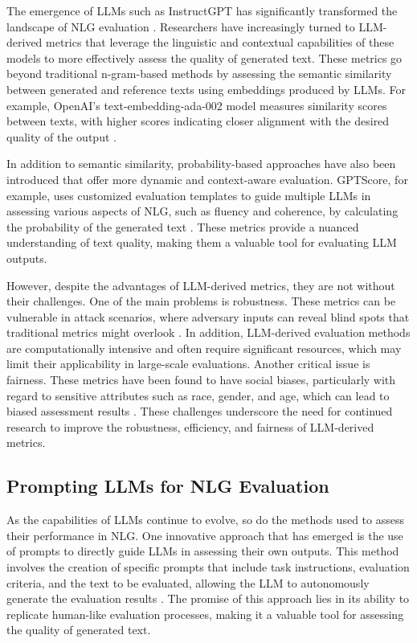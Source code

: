 The emergence of LLMs such as InstructGPT has significantly transformed the landscape of NLG evaluation \cite{ouyang2022training}. Researchers have increasingly turned to LLM-derived metrics that leverage the linguistic and contextual capabilities of these models to more effectively assess the quality of generated text. These metrics go beyond traditional n-gram-based methods by assessing the semantic similarity between generated and reference texts using embeddings produced by LLMs. For example, OpenAI's text-embedding-ada-002 model measures similarity scores between texts, with higher scores indicating closer alignment with the desired quality of the output \cite{es2023ragas}.

In addition to semantic similarity, probability-based approaches have also been introduced that offer more dynamic and context-aware evaluation. GPTScore, for example, uses customized evaluation templates to guide multiple LLMs in assessing various aspects of NLG, such as fluency and coherence, by calculating the probability of the generated text \cite{fu2023gptscore}. These metrics provide a nuanced understanding of text quality, making them a valuable tool for evaluating LLM outputs.

However, despite the advantages of LLM-derived metrics, they are not without their challenges. One of the main problems is robustness. These metrics can be vulnerable in attack scenarios, where adversary inputs can reveal blind spots that traditional metrics might overlook \cite{he2022blind}. In addition, LLM-derived evaluation methods are computationally intensive and often require significant resources, which may limit their applicability in large-scale evaluations. Another critical issue is fairness. These metrics have been found to have social biases, particularly with regard to sensitive attributes such as race, gender, and age, which can lead to biased assessment results \cite{sun2022bertscore}. These challenges underscore the need for continued research to improve the robustness, efficiency, and fairness of LLM-derived metrics.

\subsection{Prompting LLMs for NLG Evaluation}

As the capabilities of LLMs continue to evolve, so do the methods used to assess their performance in NLG. One innovative approach that has emerged is the use of prompts to directly guide LLMs in assessing their own outputs. This method involves the creation of specific prompts that include task instructions, evaluation criteria, and the text to be evaluated, allowing the LLM to autonomously generate the evaluation results \cite{gao2024llm}. The promise of this approach lies in its ability to replicate human-like evaluation processes, making it a valuable tool for assessing the quality of generated text.

